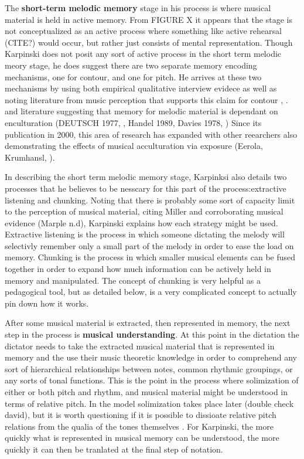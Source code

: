 \documentclass[]{book}
\theoremstyle{definition}
\theoremstyle{definition}
\theoremstyle{definition}
\theoremstyle{remark}
\begin{document}
The \textbf{short-term melodic memory} stage in his process is where
musical material is held in active memory. From FIGURE X it appears that
the stage is not conceptualized as an active process where something
like active rehearsal (CITE?) would occur, but rather just consists of
mental representation. Though Karpinski does not posit any sort of
active process in the short term melodic meory stage, he does suggest
there are two separate memory encoding mechanisms, one for contour, and
one for pitch. He arrives at these two mechanisms by using both
empirical qualitative interview evidece as well as noting literature
from music perception that supports this claim for contour
\citep{dowlingScaleContourTwo1978},
\citep{dewittRecognitionNovelMelodies1986}. and literature suggesting
that memory for melodic material is dependant on enculturation (DEUTSCH
1977, \citep{ouraMemoryMelodiesSubjects1988}, Handel 1989, Davies 1978,
\citep{dowlingExpectancyAttentionMelody1990}) Since its publication in
2000, this area of research has expanded with other reearchers also
demonstrating the effects of musical acculturation via exposure (Eerola,
Krumhansl, \citep{pearceAuditoryExpectationInformation2012}).

In describing the short term melodic memory stage, Karpinksi also
details two processes that he believes to be nesscary for this part of
the process:extractive listening and chunking. Noting that there is
probably some sort of capacity limit to the perception of musical
material, citing Miller \citep{millerMagicalNumberSeven1956} and
corroborating musical evidence (Marple n.d), Karpinski explains how each
strategy might be used. Extractive listening is the process in which
someone dictating the melody will selectivly remember only a small part
of the melody in order to ease the load on memory. Chunking is the
process in which smaller musical elements can be fused together in order
to expand how much information can be actively held in memory and
manipulated. The concept of chunking is very helpful as a pedagogical
tool, but as detailed below, is a very complicated concept to actually
pin down how it works.

After some musical material is extracted, then represented in memory,
the next step in the process is \textbf{musical understanding}. At this
point in the dictation the dictator needs to take the extracted musical
material that is represented in memory and the use their music theoretic
knowledge in order to comprehend any sort of hierarchical relationships
between notes, common rhythmic groupings, or any sorts of tonal
functions. This is the point in the process where solimization of either
or both pitch and rhythm, and musical material might be understood in
terms of relative pitch. In the model solimization takes place later
(double check david), but it is worth questioning if it is possible to
dissioate relative pitch relations from the qualia of the tones
themselves \citep{arthurPerceptualStudyScaledegree2018}. For Karpinski,
the more quickly what is represented in musical memory can be
understood, the more quickly it can then be tranlated at the final step
of notation.
\end{document}
